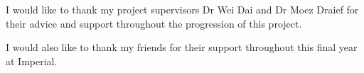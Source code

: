

\begin{acknowledgements}      %


I would like to thank my project supervisors Dr Wei Dai and Dr Moez Draief for their advice and support throughout the progression of this project.

I would also like to thank my friends for their support throughout this final year at Imperial.
\end{acknowledgements}


